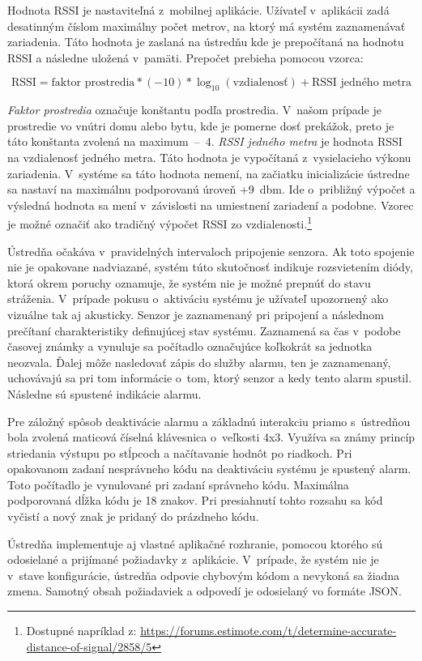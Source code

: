 Hodnota RSSI je nastaviteľná z~mobilnej aplikácie. Užívateľ v~aplikácii zadá desatinným číslom maximálny počet metrov, na ktorý má systém zaznamenávať zariadenia. Táto hodnota je zaslaná na ústredňu kde je prepočítaná na hodnotu RSSI a následne uložená v~pamäti. Prepočet prebieha pomocou vzorca:

$$\text{RSSI} = \text{faktor prostredia} * (- 10) * \log_{10}(\text{vzdialenosť}) + \text{RSSI jedného metra}$$

\textit{Faktor prostredia} označuje konštantu podľa prostredia. V~našom prípade je prostredie vo vnútri domu alebo bytu, kde je pomerne dosť prekážok, preto je táto konštanta zvolená na maximum~--~4. \textit{RSSI jedného metra} je hodnota RSSI na vzdialenosť jedného metra. Táto hodnota je vypočítaná z~vysielacieho výkonu zariadenia. V~systéme sa táto hodnota nemení, na začiatku inicializácie ústredne sa nastaví na maximálnu podporovanú úroveň +9~dbm. Ide o~približný výpočet a výsledná hodnota sa mení v~závislosti na umiestnení zariadení a podobne. Vzorec je možné označiť ako tradičný výpočet RSSI zo vzdialenosti.\footnote{Dostupné napríklad z: \url{https://forums.estimote.com/t/determine-accurate-distance-of-signal/2858/5}}

Ústredňa očakáva v~pravidelných intervaloch pripojenie senzora. Ak toto spojenie nie je opakovane nadviazané, systém túto skutočnosť indikuje rozsvietením diódy, ktorá okrem poruchy oznamuje, že systém nie je možné prepnúť do stavu stráženia. V~prípade pokusu o~aktiváciu systému je užívateľ upozornený ako vizuálne tak aj akusticky. Senzor je zaznamenaný pri pripojení a následnom prečítaní charakteristiky definujúcej stav systému. Zaznamená sa čas v~podobe časovej známky a vynuluje sa počítadlo označujúce koľkokrát sa jednotka neozvala. Ďalej môže nasledovať zápis do služby alarmu, ten je zaznamenaný, uchovávajú sa pri tom informácie o~tom, ktorý senzor a kedy tento alarm spustil. Následne sú spustené indikácie alarmu.

Pre záložný spôsob deaktivácie alarmu a základnú interakciu priamo s~ústredňou bola zvolená maticová číselná klávesnica o~veľkosti 4x3. Využíva sa známy princíp striedania výstupu po stĺpcoch a načítavanie hodnôt po riadkoch. Pri opakovanom zadaní nesprávneho kódu na deaktiváciu systému je spustený alarm. Toto počítadlo je vynulované pri zadaní správneho kódu. Maximálna podporovaná dĺžka kódu je 18 znakov. Pri presiahnutí tohto rozsahu sa kód vyčistí a nový znak je pridaný do prázdneho kódu.

Ústredňa implementuje aj vlastné aplikačné rozhranie, pomocou ktorého sú odosielané a prijímané požiadavky z~aplikácie. V~prípade, že systém nie je v~stave konfigurácie, ústredňa odpovie chybovým kódom a nevykoná sa žiadna zmena. Samotný obsah požiadaviek a odpovedí je odosielaný vo formáte JSON.


